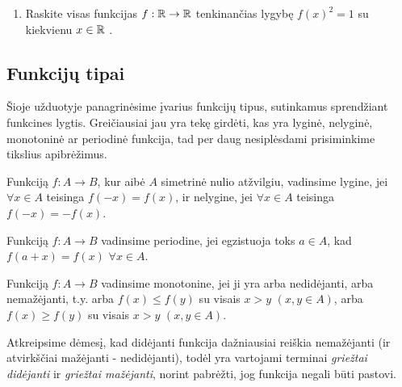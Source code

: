 \begin{enumerate}
  \item Raskite visas funkcijas $f:\mathbb R\to\mathbb R$ tenkinančias lygybę $f(x)^2=1$
    su kiekvienu $x\in\mathbb R$ .

\end{enumerate}

\newpage
\subsection{Funkcijų tipai}

Šioje užduotyje panagrinėsime įvarius funkcijų tipus, sutinkamus sprendžiant
funkcines lygtis. Greičiausiai jau yra tekę girdėti, kas yra lyginė,
nelyginė, monotoninė ar periodinė funkcija, tad per daug nesiplėsdami
prisiminkime tikslius apibrėžimus.

\begin{api}
Funkciją $f:A\to B$, kur aibė $A$ simetrinė nulio atžvilgiu,
vadinsime lygine, jei $\forall x \in A$ teisinga $f(-x)=f(x) $, ir nelygine,
jei $\forall x \in A$ teisinga $f(-x) = -f(x)$.
\end{api}

\begin{api}
Funkciją $f:A\to B$ vadinsime periodine, jei egzistuoja toks $a\in A$, kad
$f(a+x)=f(x)$ $\forall x\in A$.
\end{api}

\begin{api}
Funkciją $f:A\to B$ vadinsime monotonine, jei ji yra arba nedidėjanti, arba
nemažėjanti, t.y. arba $f(x)\leq f(y)$ su visais $x>y$ $(x,y\in A)$, arba
$f(x)\geq f(y)$ su visais $x>y$ $(x,y \in A)$.
\end{api}

Atkreipsime dėmesį, kad didėjanti funkcija dažniausiai reiškia nemažėjanti
(ir atvirkščiai mažėjanti - nedidėjanti), todėl yra vartojami terminai
\emph{griežtai didėjanti} ir \emph{griežtai mažėjanti}, norint pabrėžti,
jog funkcija negali būti pastovi.

